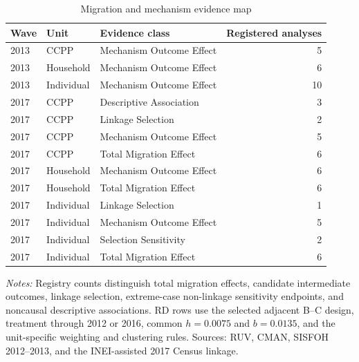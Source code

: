 \begin{table}[!htbp]
\centering
\small
\caption{Migration and mechanism evidence map}
\label{tab:rd_mechanisms_evidence_map}
\begin{tabular}{lllr}
\toprule
Wave & Unit & Evidence class & Registered analyses \\
\midrule
2013 & CCPP & Mechanism Outcome Effect & 5 \\
2013 & Household & Mechanism Outcome Effect & 6 \\
2013 & Individual & Mechanism Outcome Effect & 10 \\
2017 & CCPP & Descriptive Association & 3 \\
2017 & CCPP & Linkage Selection & 2 \\
2017 & CCPP & Mechanism Outcome Effect & 5 \\
2017 & CCPP & Total Migration Effect & 6 \\
2017 & Household & Mechanism Outcome Effect & 6 \\
2017 & Household & Total Migration Effect & 6 \\
2017 & Individual & Linkage Selection & 1 \\
2017 & Individual & Mechanism Outcome Effect & 5 \\
2017 & Individual & Selection Sensitivity & 2 \\
2017 & Individual & Total Migration Effect & 6 \\
\bottomrule
\end{tabular}
\parbox{0.97\linewidth}{\footnotesize \textit{Notes:} Registry counts distinguish total migration effects, candidate intermediate outcomes, linkage selection, extreme-case non-linkage sensitivity endpoints, and noncausal descriptive associations. RD rows use the selected adjacent B--C design, treatment through 2012 or 2016, common \(h=0.0075\) and \(b=0.0135\), and the unit-specific weighting and clustering rules. Sources: RUV, CMAN, SISFOH 2012--2013, and the INEI-assisted 2017 Census linkage.}
\end{table}
